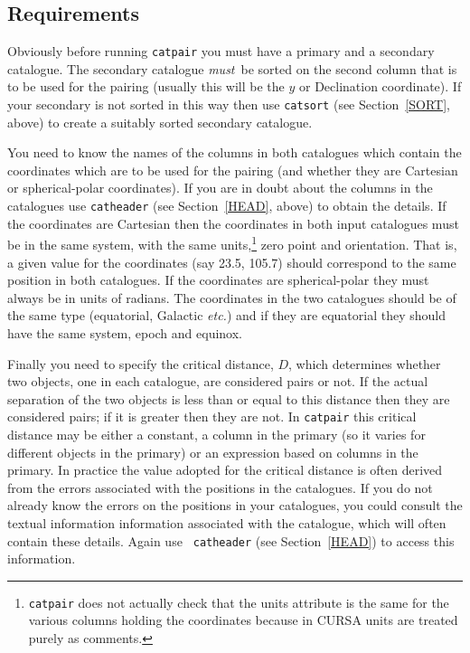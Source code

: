 \documentclass[twoside,11pt]{article}
\renewcommand{\_}{\texttt{\symbol{95}}}
\begin{document}
\subsection{Requirements}

Obviously before running {\tt catpair} you must have a primary and a
secondary catalogue. The secondary catalogue {\it must}\, be sorted on
the second column that is to be used for the pairing (usually this will
be the $y$ or Declination coordinate). If your secondary is not sorted 
in this way then use {\tt catsort} (see Section~\ref{SORT}, above) to 
create a suitably sorted secondary catalogue.

You need to know the names of the columns in both catalogues which
contain the coordinates which are to be used for the pairing (and whether
they are Cartesian or spherical-polar coordinates). If you are in doubt
about the columns in the catalogues use {\tt catheader} (see
Section~\ref{HEAD}, above) to obtain the details. If the coordinates
are Cartesian then the coordinates in both input catalogues must be in
the same system, with the same units,\footnote{{\tt catpair} does not
actually check that the units attribute is the same for the various
columns holding the coordinates because in CURSA units are treated 
purely as comments.} zero point and orientation. That is, a given value
for the coordinates (say 23.5, 105.7) should correspond to the same
position in both catalogues. If the coordinates are spherical-polar
they must always be in units of radians. The coordinates in the two
catalogues should be of the same type (equatorial, Galactic \emph{etc.}\/)
and if they are equatorial they should have the same system, epoch and
equinox.

Finally you need to specify the critical distance, $D$, which determines
whether two objects, one in each catalogue, are considered pairs or not.
If the actual separation of the two objects is less than or equal to
this distance then they are considered pairs; if it is greater then they
are not. In {\tt catpair} this critical distance may be either a
constant, a column in the primary (so it varies for different objects in 
the primary) or an expression based on columns in the primary. In
practice the value adopted for the critical distance is often derived
from the errors associated with the positions in the catalogues. If
you do not already know the errors on the positions in your catalogues,
you could consult the textual information information associated with
the catalogue, which will often contain these details. Again use {\tt
catheader} (see Section~\ref{HEAD}) to access this information.
\end{document}
